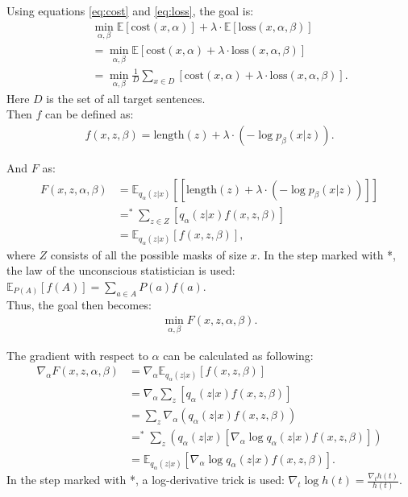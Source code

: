 Using equations \ref{eq:cost} and \ref{eq:loss}, the goal is:
\begin{align*}
    \quad & \min_{\alpha, \beta} \mathbb{E} [\text{cost}(x, \alpha)] + \lambda \cdot \mathbb{E}[\text{loss}(x, \alpha, \beta)] \\
    &= \min_{\alpha, \beta} \mathbb{E} [\text{cost}(x, \alpha) + \lambda \cdot \text{loss}(x, \alpha, \beta)] \\
    &= \min_{\alpha, \beta} \frac{1}{D} \sum_{x \in D}[\text{cost}(x, \alpha) + \lambda \cdot \text{loss}(x, \alpha, \beta)].
\end{align*}
Here $D$ is the set of all target sentences. \\

\noindent Then $f$ can be defined as:
\begin{align*}
    f(x, z, \beta) = \text{length}(z) + \lambda \cdot (-\log p_{\beta}(x|z)).
\end{align*}

\noindent And $F$ as:
\begin{align*}
    F(x, z, \alpha, \beta) &= \mathbb{E}_{q_{\alpha}(z|x)} [[\text{length}(z) + \lambda \cdot (-\log p_{\beta}(x|z))]] \\
    &=^{\ast} \sum_{z\in Z} [q_{\alpha}(z|x) f(x, z, \beta)] \\
    &= \mathbb{E}_{q_{\alpha}(z|x)}[f(x, z, \beta)],
\end{align*}
where $Z$ consists of all the possible masks of size $x$.
In the step marked with *, the law of the unconscious statistician is used: $\mathbb{E}_{P(A)}[f(A)] = \sum_{a \in A}P(a)f(a)$. \\

\noindent Thus, the goal then becomes:
\begin{align*}
    \min_{\alpha, \beta} F(x, z, \alpha, \beta).
\end{align*}

\noindent The gradient with respect to $\alpha$ can be calculated as following:
\begin{align*}
    \nabla_{\alpha} F(x, z, \alpha, \beta) &= \nabla_{\alpha} \mathbb{E}_{q_{\alpha}(z|x)} [f(x, z, \beta)] \\
    &= \nabla_{\alpha} \sum_z [q_{\alpha}(z|x) f(x, z, \beta)] \\
    &= \sum_z \nabla_{\alpha} (q_{\alpha}(z|x) f(x, z, \beta)) \\
    &=^\ast \sum_z (q_{\alpha}(z|x) [\nabla_{\alpha} \log q_{\alpha}(z|x) f(x, z, \beta)]) \\
    &= \mathbb{E}_{q_{\alpha}(z|x)} [\nabla_{\alpha} \log q_{\alpha}(z|x) f(x, z, \beta)].
\end{align*}
In the step marked with *, a log-derivative trick is used: $\nabla_t \log h(t) = \frac{\nabla_t h(t)}{h(t)}$. \\


